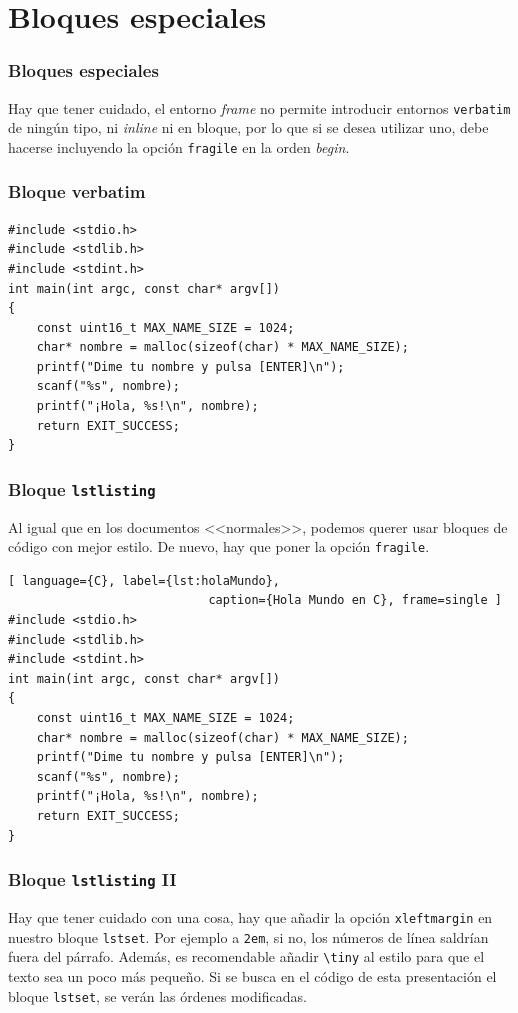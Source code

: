 \documentclass{beamer}
\begin{document}
    \section{Bloques especiales}
    \begin{frame}
        \frametitle{Bloques especiales}
        Hay que tener cuidado, el entorno \textit{frame} no permite introducir
        entornos \texttt{verbatim} de ningún tipo, ni \textit{inline} ni en
        bloque, por lo que si se desea utilizar uno, debe hacerse incluyendo
        la opción \texttt{fragile} en la orden \textit{begin}.
    \end{frame}
    \begin{frame}[fragile]
        \frametitle{Bloque verbatim}
        \begin{verbatim}
#include <stdio.h>
#include <stdlib.h>
#include <stdint.h>
int main(int argc, const char* argv[])
{
    const uint16_t MAX_NAME_SIZE = 1024;
    char* nombre = malloc(sizeof(char) * MAX_NAME_SIZE);
    printf("Dime tu nombre y pulsa [ENTER]\n");
    scanf("%s", nombre);
    printf("¡Hola, %s!\n", nombre);
    return EXIT_SUCCESS;
}
        \end{verbatim}
    \end{frame}
    \begin{frame}
        \frametitle{Bloque \texttt{lstlisting}}
        Al igual que en los documentos <<normales>>, podemos querer usar bloques
        de código con mejor estilo. De nuevo, hay que poner la opción
        \texttt{fragile}.
        
        \begin{lstlisting}[ language={C}, label={lst:holaMundo},
                            caption={Hola Mundo en C}, frame=single ]
#include <stdio.h>
#include <stdlib.h>
#include <stdint.h>
int main(int argc, const char* argv[])
{
    const uint16_t MAX_NAME_SIZE = 1024;
    char* nombre = malloc(sizeof(char) * MAX_NAME_SIZE);
    printf("Dime tu nombre y pulsa [ENTER]\n");
    scanf("%s", nombre);
    printf("¡Hola, %s!\n", nombre);
    return EXIT_SUCCESS;
}
        \end{lstlisting}
    \end{frame}
    \begin{frame}[fragile]
        \frametitle{Bloque \texttt{lstlisting} II}
        Hay que tener cuidado con una cosa, hay que añadir la opción
        \verb!xleftmargin! en nuestro bloque \verb!lstset!. Por ejemplo a
        \verb!2em!, si no, los números de línea saldrían fuera del párrafo.
        Además, es recomendable añadir \verb!\tiny! al estilo para que el texto
        sea un poco más pequeño. Si se busca en el código de esta presentación
        el bloque \verb!lstset!, se verán las órdenes modificadas.
    \end{frame}
\end{document}
